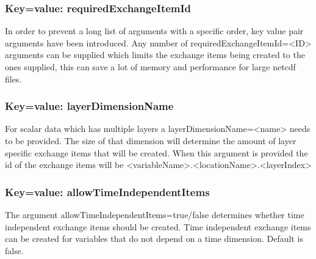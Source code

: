 \subsubsection{Key=value: requiredExchangeItemId}
In order to prevent a long list of arguments with a specific order, key value pair arguments have been introduced.
Any number of requiredExchangeItemId=<ID> arguments can be supplied which limits the exchange items being created to the ones supplied, this can save a lot of memory and performance for large netcdf files.

\subsubsection{Key=value: layerDimensionName}
For scalar data which has multiple layers a layerDimensionName=<name> needs to be provided. 
The size of that dimension will determine the amount of layer specific exchange items that will be created.
When this argument is provided the id of the exchange items will be <variableName>.<locationName>.<layerIndex>

\subsubsection{Key=value: allowTimeIndependentItems}
The argument allowTimeIndependentItems=true/false determines whether time independent exchange items should be created.
Time independent exchange items can be created for variables that do not depend on a time dimension.
Default is false.

